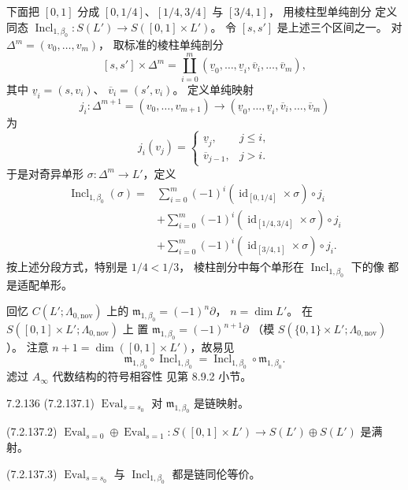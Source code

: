 下面把 $[0,1]$ 分成
$[0,1/4]$、$[1/4,3/4]$ 与 $[3/4,1]$，
用棱柱型单纯剖分%
定义同态
$\operatorname{Incl}_{1,\beta_0}\colon
S(L')\to S([0,1]\times L')$。
令 $[s,s']$ 是上述三个区间之一。
对 $\Delta^m=(v_0,\ldots,v_m)$，
取标准的棱柱单纯剖分
\[
[s,s']\times\Delta^m
=\coprod_{i=0}^{m}
(\underline v_0,\ldots,\underline v_i,
\overline v_i,\ldots,\overline v_m),
\]
其中 $\underline v_i=(s,v_i)$、
$\overline v_i=(s',v_i)$。
定义单纯映射
\[
j_i\colon\Delta^{m+1}=(v_0,\ldots,v_{m+1})
\longrightarrow
(\underline v_0,\ldots,\underline v_i,
\overline v_i,\ldots,\overline v_m)
\]
为
\[
j_i(v_j)=
\begin{cases}
\underline v_j,&j\le i,\\
\overline v_{j-1},&j>i.
\end{cases}
\]
于是对奇异单形 $\sigma\colon\Delta^m\to L'$，定义
\begin{equation}
\begin{aligned}
\operatorname{Incl}_{1,\beta_0}(\sigma)
={}&\sum_{i=0}^{m}(-1)^i
(\operatorname{id}_{[0,1/4]}\times\sigma)\circ j_i\\
&+\sum_{i=0}^{m}(-1)^i
(\operatorname{id}_{[1/4,3/4]}\times\sigma)\circ j_i\\
&+\sum_{i=0}^{m}(-1)^i
(\operatorname{id}_{[3/4,1]}\times\sigma)\circ j_i.
\end{aligned}
\tag{7.2.135}\label{eq:7-2-135}
\end{equation}
按上述分段方式，特别是 $1/4<1/3$，
棱柱剖分中每个单形在
$\operatorname{Incl}_{1,\beta_0}$ 下的像
都是适配单形。

回忆 $C(L';\Lambda_{0,\mathrm{nov}})$ 上的
$\mathfrak m_{1,\beta_0}=(-1)^n\partial$，
$n=\dim L'$。
在 $S([0,1]\times L';\Lambda_{0,\mathrm{nov}})$ 上
置 $\mathfrak m_{1,\beta_0}=(-1)^{n+1}\partial$
（模 $S(\{0,1\}\times L';\Lambda_{0,\mathrm{nov}})$）。
注意 $n+1=\dim([0,1]\times L')$，故易见
\[
\mathfrak m_{1,\beta_0}\circ
\operatorname{Incl}_{1,\beta_0}
=\operatorname{Incl}_{1,\beta_0}\circ
\mathfrak m_{1,\beta_0}.
\]
滤过 $A_\infty$ 代数结构的符号相容性
见第 8.9.2 小节。

\begin{lemma}{7.2.136}\label{lem:7-2-136}
\noindent\textup{(7.2.137.1)}\quad
$\operatorname{Eval}_{s=s_0}$ 对
$\mathfrak m_{1,\beta_0}$ 是链映射。

\noindent\textup{(7.2.137.2)}\quad
$\operatorname{Eval}_{s=0}\oplus
\operatorname{Eval}_{s=1}\colon
S([0,1]\times L')\to S(L')\oplus S(L')$
是满射。

\noindent\textup{(7.2.137.3)}\quad
$\operatorname{Eval}_{s=s_0}$ 与
$\operatorname{Incl}_{1,\beta_0}$
都是链同伦等价。
\end{lemma}

